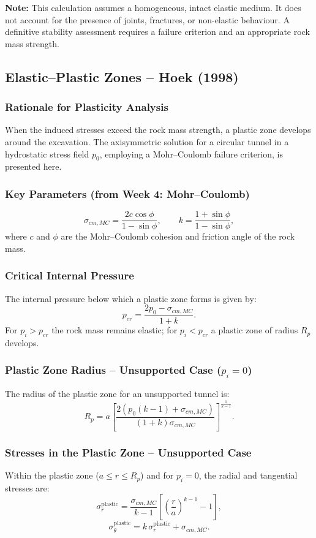 \documentclass[a4paper,12pt]{article}
\begin{document}
\textbf{Note:} This calculation assumes a homogeneous, intact elastic medium. It does not account for the presence of joints, fractures, or non-elastic behaviour. A definitive stability assessment requires a failure criterion and an appropriate rock mass strength.

\subsection{Elastic--Plastic Zones -- Hoek (1998)}

\subsubsection{Rationale for Plasticity Analysis}
When the induced stresses exceed the rock mass strength, a plastic zone develops around the excavation. The axisymmetric solution for a circular tunnel in a hydrostatic stress field $p_0$, employing a Mohr--Coulomb failure criterion, is presented here.

\subsubsection{Key Parameters (from Week 4: Mohr--Coulomb)}
\[
\sigma_{cm,MC} = \frac{2c\cos\phi}{1-\sin\phi}, \qquad
k = \frac{1+\sin\phi}{1-\sin\phi},
\]
where $c$ and $\phi$ are the Mohr--Coulomb cohesion and friction angle of the rock mass.

\subsubsection{Critical Internal Pressure}
The internal pressure below which a plastic zone forms is given by:
\[
p_{cr} = \frac{2p_0 - \sigma_{cm,MC}}{1 + k}.
\]
For $p_i > p_{cr}$ the rock mass remains elastic; for $p_i < p_{cr}$ a plastic zone of radius $R_p$ develops.

\subsubsection{Plastic Zone Radius -- Unsupported Case ($p_i = 0$)}
The radius of the plastic zone for an unsupported tunnel is:
\[
R_p = a \left[ \frac{2\left(p_0(k - 1) + \sigma_{cm,MC}\right)}{(1 + k)\sigma_{cm,MC}} \right]^{\frac{1}{k-1}}.
\]

\subsubsection{Stresses in the Plastic Zone -- Unsupported Case}
Within the plastic zone ($a \leq r \leq R_p$) and for $p_i = 0$, the radial and tangential stresses are:
\[
\sigma_r^{\text{plastic}} = \frac{\sigma_{cm,MC}}{k - 1}\left[\left(\frac{r}{a}\right)^{k-1} - 1\right],
\]
\[
\sigma_\theta^{\text{plastic}} = k\,\sigma_r^{\text{plastic}} + \sigma_{cm,MC}.
\]
\end{document}
